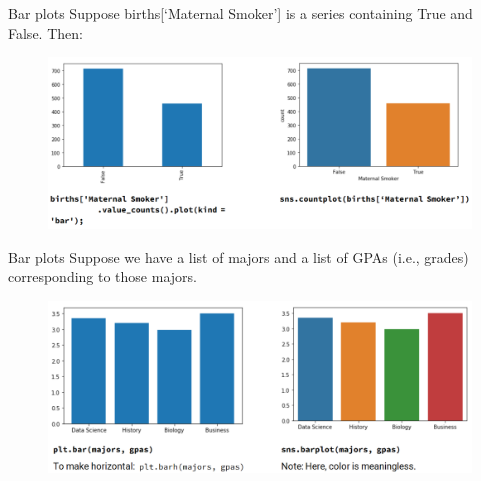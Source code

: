 \documentclass[aspectratio=169]{../latex_main/tntbeamer}  %
\begin{document}
	
	\begin{frame}{Bar plots}
	    Suppose births[‘Maternal Smoker’] is a series containing True and False. Then:
	    \begin{figure}
	        \centering
            \includegraphics[scale=.4]{Bild22}
	    \end{figure}
	\end{frame}
	
	
	
	\begin{frame}{Bar plots}
	    Suppose we have a list of majors and a list of GPAs (i.e., grades) corresponding to those majors.
	    \begin{figure}
	        \centering
            \includegraphics[scale=.4]{Bild23}
	    \end{figure}
	\end{frame}
	
\end{document}
